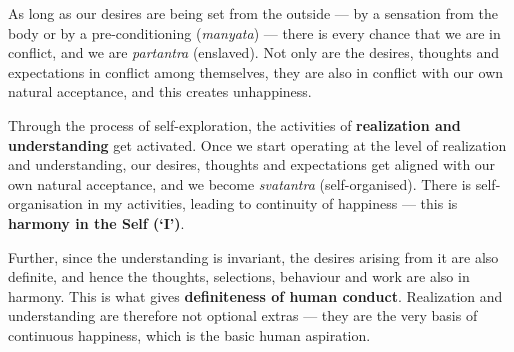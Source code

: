 As long as our desires are being set from the outside --- by a sensation from
the body or by a pre-conditioning (\emph{manyata}) --- there is every chance
that we are in conflict, and we are \emph{partantra} (enslaved). Not only are
the desires, thoughts and expectations in conflict among themselves, they are
also in conflict with our own natural acceptance, and this creates
unhappiness.

Through the process of self-exploration, the activities of \textbf{realization
and understanding} get activated. Once we start operating at the level of
realization and understanding, our desires, thoughts and expectations get
aligned with our own natural acceptance, and we become \emph{svatantra}
(self-organised). There is self-organisation in my activities, leading to
continuity of happiness --- this is \textbf{harmony in the Self (`I')}.

Further, since the understanding is invariant, the desires arising from it are
also definite, and hence the thoughts, selections, behaviour and work are also
in harmony. This is what gives \textbf{definiteness of human conduct}.
Realization and understanding are therefore not optional extras --- they are
the very basis of continuous happiness, which is the basic human aspiration.
